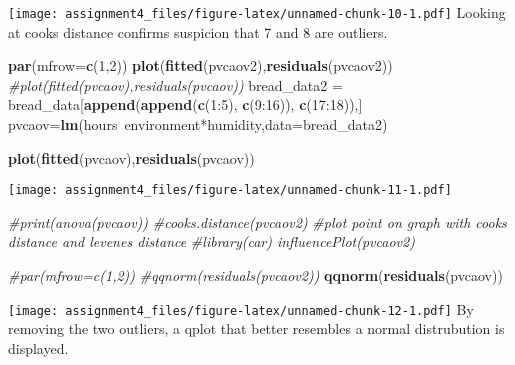 \documentclass[11pt,]{article}
\newenvironment{Shaded}{\begin{snugshade}}{\end{snugshade}}
\newcommand{\KeywordTok}[1]{\textcolor[rgb]{0.13,0.29,0.53}{\textbf{{#1}}}}
\newcommand{\DataTypeTok}[1]{\textcolor[rgb]{0.13,0.29,0.53}{{#1}}}
\newcommand{\DecValTok}[1]{\textcolor[rgb]{0.00,0.00,0.81}{{#1}}}
\newcommand{\StringTok}[1]{\textcolor[rgb]{0.31,0.60,0.02}{{#1}}}
\newcommand{\CommentTok}[1]{\textcolor[rgb]{0.56,0.35,0.01}{\textit{{#1}}}}
\newcommand{\NormalTok}[1]{{#1}}
\begin{document}
\texttt{[image: assignment4\_files/figure-latex/unnamed-chunk-10-1.pdf]}
Looking at cooks distance confirms suspicion that 7 and 8 are outliers.

\begin{Shaded}
\begin{Highlighting}[]
  \KeywordTok{par}\NormalTok{(}\DataTypeTok{mfrow=}\KeywordTok{c}\NormalTok{(}\DecValTok{1}\NormalTok{,}\DecValTok{2}\NormalTok{))}
  \KeywordTok{plot}\NormalTok{(}\KeywordTok{fitted}\NormalTok{(pvcaov2),}\KeywordTok{residuals}\NormalTok{(pvcaov2))}
  \CommentTok{#plot(fitted(pvcaov),residuals(pvcaov))}
  \NormalTok{bread_data2 =}\StringTok{ }\NormalTok{bread_data[}\KeywordTok{append}\NormalTok{(}\KeywordTok{append}\NormalTok{(}\KeywordTok{c}\NormalTok{(}\DecValTok{1}\NormalTok{:}\DecValTok{5}\NormalTok{), }\KeywordTok{c}\NormalTok{(}\DecValTok{9}\NormalTok{:}\DecValTok{16}\NormalTok{)), }\KeywordTok{c}\NormalTok{(}\DecValTok{17}\NormalTok{:}\DecValTok{18}\NormalTok{)),]}
  \NormalTok{pvcaov=}\KeywordTok{lm}\NormalTok{(hours~environment*humidity,}\DataTypeTok{data=}\NormalTok{bread_data2)}

  \KeywordTok{plot}\NormalTok{(}\KeywordTok{fitted}\NormalTok{(pvcaov),}\KeywordTok{residuals}\NormalTok{(pvcaov))}
\end{Highlighting}
\end{Shaded}

\texttt{[image: assignment4\_files/figure-latex/unnamed-chunk-11-1.pdf]}

\begin{Shaded}
\begin{Highlighting}[]
  \CommentTok{#print(anova(pvcaov))}
  \CommentTok{#cooks.distance(pvcaov2)}
  \CommentTok{#plot point on graph with cooks distance and levenes distance}
  \CommentTok{#library(car)  influencePlot(pvcaov2)}
\end{Highlighting}
\end{Shaded}

\begin{Shaded}
\begin{Highlighting}[]
 \CommentTok{#par(mfrow=c(1,2))}
 \CommentTok{#qqnorm(residuals(pvcaov2))}
 \KeywordTok{qqnorm}\NormalTok{(}\KeywordTok{residuals}\NormalTok{(pvcaov))}
\end{Highlighting}
\end{Shaded}

\texttt{[image: assignment4\_files/figure-latex/unnamed-chunk-12-1.pdf]}
By removing the two outliers, a qplot that better resembles a normal
distrubution is displayed.
\end{document}

